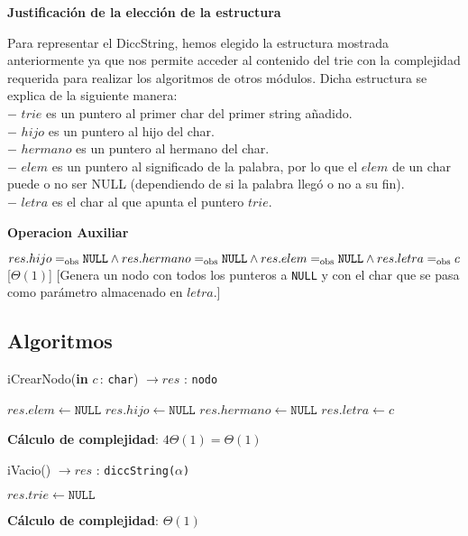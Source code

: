 \documentclass[10pt, a4paper]{article}
\let\TipoVariable=\texttt
\let\ModificadorArgumento=\textbf
\newcommand{\In}[2]{\ModificadorArgumento{in} \ensuremath{#1}\,: \TipoVariable{#2}\xspace}
\newcommand{\modTitulo}[1]{
  \vspace*{1ex}\par\noindent\textbf{\large #1}\par
}
\newcommand{\DRef}{\ensuremath{\rightarrow}}
\begin{document}
\modTitulo{Justificaci\'on de la elecci\'on de la estructura}
Para representar el DiccString, hemos elegido la estructura mostrada anteriormente ya que nos permite acceder al contenido del trie con la complejidad requerida para realizar los algoritmos de otros m\'odulos. Dicha estructura se explica de la siguiente manera:\\
$-$ $trie$ es un puntero al primer char del primer string añadido.\\
$-$ $hijo$ es un puntero al hijo del char.\\
$-$ $hermano$ es un puntero al hermano del char.\\
$-$ $elem$ es un puntero al significado de la palabra, por lo que el $elem$ de un char puede o no ser NULL (dependiendo de si la palabra lleg\'o o no a su fin).\\
$-$ $letra$ es el char al que apunta el puntero $trie$.\\


\modTitulo{Operacion Auxiliar}

	\InterfazFuncion{crearNodo}{\In {c}{char}}{nodo}
	  {$res.hijo \igobs \TipoVariable{NULL} \land res.hermano \igobs \TipoVariable{NULL} \land res.elem \igobs \TipoVariable{NULL} \land res.letra \igobs c$}
	  [$\Theta(1)$]
	  [Genera un nodo con todos los punteros a \TipoVariable{NULL} y con el char que se pasa como par\'ametro almacenado en $letra$.]

\subsection{Algoritmos}

\begin{algorithm}[H]
\caption*{iCrearNodo(\In{c}{char}) $\DRef res$ : \TipoVariable{nodo}}
\begin{algorithmic}[1]
	\State $res.elem \gets \TipoVariable{NULL}$ 
	\State $res.hijo \gets \TipoVariable{NULL}$ 
	\State $res.hermano \gets \TipoVariable{NULL}$ 
	\State $res.letra \gets c$ 
\end{algorithmic}
\textbf{C\'alculo de complejidad}: $4\Theta(1) = \Theta(1)$
\end{algorithm}

\begin{algorithm}[H]
\caption*{iVacio() $\DRef res$ : \TipoVariable{diccString($\alpha$)}}
\begin{algorithmic}[1]
	\State $res.trie \gets \TipoVariable{NULL}$ 
\end{algorithmic}
\textbf{C\'alculo de complejidad}: $\Theta(1)$
\end{algorithm}
\end{document}
